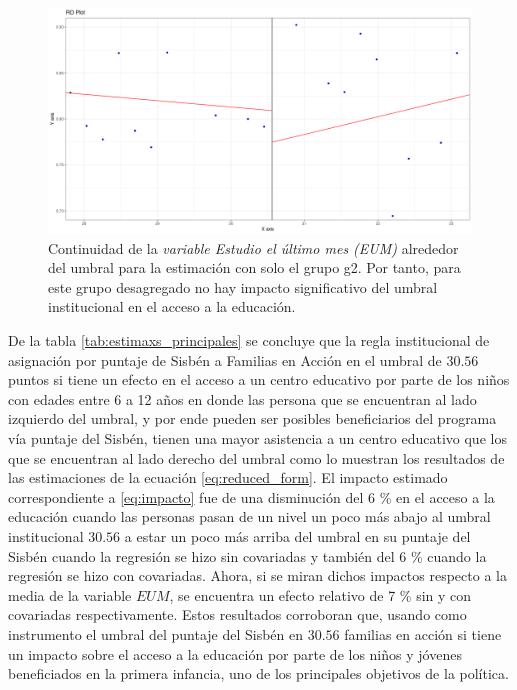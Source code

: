 \documentclass[AER]{AEA}
\begin{document}
\begin{figure}[h!]
    \centering
    \includegraphics[scale = 0.35]{imagenes/estimaxs_adicionales/g2_estimax.png}
    \caption{Continuidad de la \textit{variable Estudio el último mes (EUM)} alrededor del umbral para la estimación con solo el grupo g2. Por tanto, para este grupo desagregado no hay impacto significativo del umbral institucional en el acceso a la educación.}
    \label{fig:estimax_main_g2}
\end{figure}


De la tabla \ref{tab:estimaxs_principales} se concluye que la regla institucional de asignación por puntaje de Sisbén a Familias en Acción en el umbral de $30.56$ puntos si tiene un efecto en el acceso a un centro educativo por parte de los niños con edades entre 6 a 12 años en donde las persona que se encuentran al lado izquierdo del umbral, y por ende pueden ser posibles beneficiarios del programa vía puntaje del Sisbén, tienen una mayor asistencia a un centro educativo que los que se encuentran al lado derecho del umbral como lo muestran los resultados de las estimaciones de la ecuación \ref{eq:reduced_form}. El impacto estimado correspondiente a \ref{eq:impacto} fue de una disminución del 6 \% en el acceso a la educación cuando las personas pasan de un nivel un poco más abajo al umbral institucional $30.56$ a estar un poco más arriba del umbral en su puntaje del Sisbén cuando la regresión se hizo sin covariadas y también del 6 \% cuando la regresión se hizo con covariadas. Ahora, si se miran dichos impactos respecto a la media de la variable $EUM$, se encuentra un efecto relativo de 7 \%   sin y con covariadas respectivamente. Estos resultados corroboran que, usando como instrumento el umbral del puntaje del Sisbén en $30.56$ familias en acción si tiene un impacto sobre el acceso a la educación por parte de los niños y jóvenes beneficiados en la primera infancia, uno de los principales objetivos de la política. 
\end{document}
